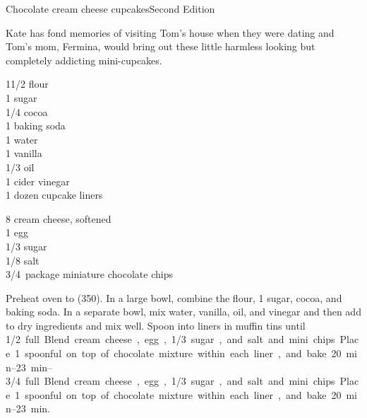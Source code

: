 \begin{entry}{Chocolate cream cheese cupcakes}{Second Edition}

\begin{open}
  Kate has fond memories of visiting Tom's house when they were dating and
  Tom's mom, Fermina, would bring out these little harmless looking but
  completely addicting mini-cupcakes.
\end{open}
\begin{ingredients}
    1\SI{1/2}{\cup} flour\\
    \SI{1}{\cup} sugar\\
    \SI{1/4}{\cup} cocoa\\
    \SI{1}{\teaspoon} baking soda\\
    \SI{1}{\cup} water\\
    \SI{1}{\teaspoon} vanilla\\
    \SI{1/3}{\cup} oil\\
    \SI{1}{\tblspoon} cider vinegar\\
    1 dozen cupcake liners
\end{ingredients}


\begin{ingredients}
    \SI{8}{\ounce} cream cheese, softened\\
    1 egg\\
    \SI{1/3}{\cup} sugar\\
    \SI{1/8}{\teaspoon} salt\\
    \SI{3/4}{package} miniature chocolate chips
\end{ingredients}
Preheat oven to (\SI{350}{\degreeF}). In a large bowl, combine the flour,
\SI{1}{\cup} sugar, cocoa, and baking soda. In a separate bowl, mix water,
vanilla, oil, and vinegar and then add to dry ingredients and mix well. Spoon
into liners in muffin tins until \SIrange{1/2}{3/4} full. Blend cream cheese,
egg, \SI{1/3}{\cup} sugar, and salt and mini chips. Place 1 spoonful on top of
chocolate mixture within each liner, and bake \SIrange{20}{23}{\minute}.
\end{entry}


